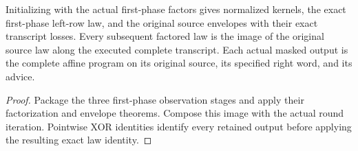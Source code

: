 \begin{theorem}
  \label{thm:lowerbounds-algebraic-affine-iteration-initial}
  \leanok
  Initializing with the actual first-phase factors gives normalized
  kernels, the exact first-phase left-row law, and the original source
  envelopes with their exact transcript losses. Every subsequent factored
  law is the image of the original source law along the executed complete
  transcript. Each actual masked output is the complete affine program
  on its original source, its specified right word, and its advice.
\end{theorem}
\begin{proof}
  \leanok
  Package the three first-phase observation stages and apply their
  factorization and envelope theorems. Compose this image with the actual
  round iteration. Pointwise XOR identities identify every retained
  output before applying the resulting exact law identity.
\end{proof}

